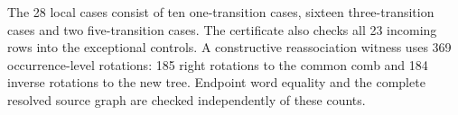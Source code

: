 The 28 local cases consist of ten one-transition cases, sixteen
three-transition cases and two five-transition cases. The certificate also
checks all 23 incoming rows into the exceptional controls. A constructive
reassociation witness uses 369 occurrence-level rotations: 185 right
rotations to the common comb and 184 inverse rotations to the new tree.
Endpoint word equality and the complete resolved source graph are checked
independently of these counts.

